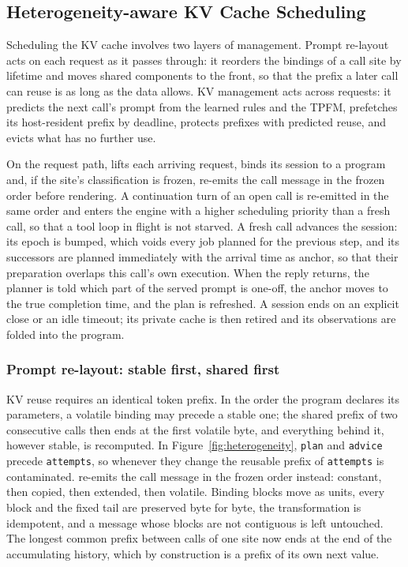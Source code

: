 \subsection{Heterogeneity-aware KV Cache Scheduling}
\label{sec:scheduling}

Scheduling the KV cache involves two layers of management. Prompt re-layout acts on each request as it passes through: it reorders the bindings of a call site by lifetime and moves shared components to the front, so that the prefix a later call can reuse is as long as the data allows. KV management acts across requests: it predicts the next call's prompt from the learned rules and the TPFM, prefetches its host-resident prefix by deadline, protects prefixes with predicted reuse, and evicts what has no further use.

On the request path, \sysname lifts each arriving request, binds its session to a program and, if the site's classification is frozen, re-emits the call message in the frozen order before rendering. A continuation turn of an open call is re-emitted in the same order and enters the engine with a higher scheduling priority than a fresh call, so that a tool loop in flight is not starved. A fresh call advances the session: its epoch is bumped, which voids every job planned for the previous step, and its successors are planned immediately with the arrival time as anchor, so that their preparation overlaps this call's own execution. When the reply returns, the planner is told which part of the served prompt is one-off, the anchor moves to the true completion time, and the plan is refreshed. A session ends on an explicit close or an idle timeout; its private cache is then retired and its observations are folded into the program.

\subsubsection{Prompt re-layout: stable first, shared first}
\label{sec:relayout}

KV reuse requires an identical token prefix. In the order the program declares its parameters, a volatile binding may precede a stable one; the shared prefix of two consecutive calls then ends at the first volatile byte, and everything behind it, however stable, is recomputed. In Figure~\ref{fig:heterogeneity}, \texttt{plan} and \texttt{advice} precede \texttt{attempts}, so whenever they change the reusable prefix of \texttt{attempts} is contaminated. \sysname re-emits the call message in the frozen order instead: constant, then copied, then extended, then volatile. Binding blocks move as units, every block and the fixed tail are preserved byte for byte, the transformation is idempotent, and a message whose blocks are not contiguous is left untouched. The longest common prefix between calls of one site now ends at the end of the accumulating history, which by construction is a prefix of its own next value.

